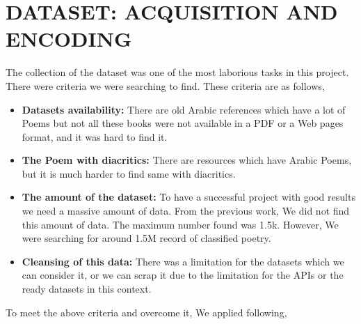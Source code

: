 \chapter{\uppercase{Dataset: Acquisition and Encoding}}\label{ch:datasets}  

  The collection of the dataset was one of the most laborious tasks in this project. There were criteria we were searching to find. These criteria are as follows,
  \begin{itemize}
    
  \item \textbf{Datasets availability:} There are old Arabic references which have a lot of Poems but not all these books were not available in a PDF or a Web pages format, and it was hard to find it.
    
  \item \textbf{The Poem with diacritics:} There are resources which have Arabic Poems, but it is much harder to find same with diacritics.
    
  \item \textbf{The amount of the dataset:} To have a successful project with good results we need a massive amount of data. From the previous work, We did not find this amount of data. The maximum number found was 1.5k. However, We were searching for around 1.5M record of classified poetry.

  
\item \textbf{Cleansing of this data:} There was a limitation for the datasets which we can consider it, or we can scrap it due to the limitation for the APIs or the ready datasets in this context.
  
\end{itemize}
To meet the above criteria and overcome it, We applied following,

